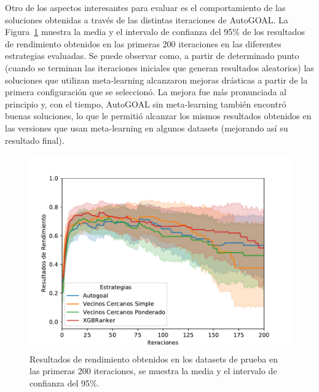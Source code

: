 Otro de los aspectos interesantes para evaluar es el comportamiento de las soluciones obtenidas a través de las distintas iteraciones de AutoGOAL. La Figura~\ref{fig:performance} muestra la media y el intervalo de confianza del 95\% de los resultados de rendimiento obtenidos en las primeras 200 iteraciones en las diferentes estrategias evaluadas. Se puede observar como, a partir de determinado punto (cuando se terminan las iteraciones iniciales que generan resultados aleatorios) las soluciones que utilizan meta-learning alcanzaron mejoras drásticas a partir de la primera configuración que se seleccionó. La mejora fue más pronunciada al principio y, con el tiempo, AutoGOAL sin meta-learning también encontró buenas soluciones, lo que le permitió alcanzar los mismos resultados obtenidos en las versiones que usan meta-learning en algunos datasets (mejorando así su resultado final). 


\begin{figure}[H]
\centering
\includegraphics[scale=.8]{Figures/performance.pdf}
\caption{Resultados de rendimiento obtenidos en los datasets de prueba en las primeras 200 iteraciones, se muestra la media y el intervalo de confianza del 95\%.}
\label{fig:performance}
\end{figure}


